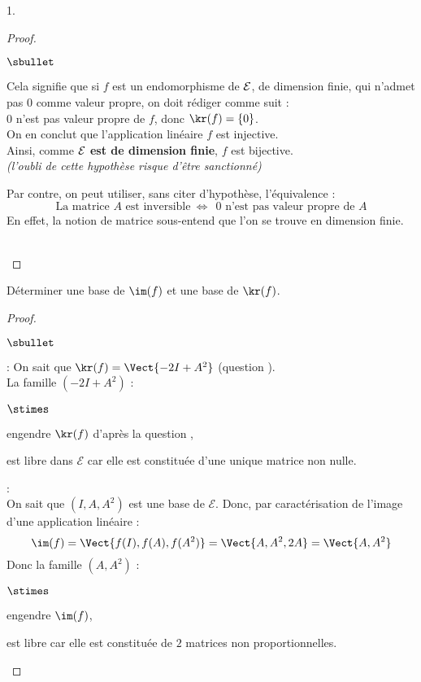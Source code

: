 \begin{noliste}{1.}
\begin{proof}
\begin{remark}
\begin{noliste}{$\sbullet$}
      \item Cela signifie que si $f$ est un endomorphisme de ${\cal
          E}$, de dimension finie, qui n'admet pas $0$ comme valeur
        propre, on doit rédiger comme suit :\\[.2cm]
        $0$ n'est pas valeur propre de $f$, donc $\kr(f) = \{0\}$.\\
        On en conclut que l'application linéaire $f$ est injective.\\
        Ainsi, comme {\bf ${\cal E}$ est de dimension finie}, $f$ est
        bijective.\\
        {\it (l'oubli de cette hypothèse risque d'être sanctionné)}
        
      \item Par contre, on peut utiliser, sans citer d'hypothèse,
      l'équivalence :
        \[
        \text{La matrice $A$ est inversible} \ \Leftrightarrow \ \
        \text{$0$ n'est pas valeur propre de $A$}
        \]
        En effet, la notion de matrice sous-entend que l'on se trouve
        en dimension finie.
      \end{noliste}
    \end{remark}~\\[-1.4cm]
\end{proof}

\item Déterminer une base de $\im(f)$ et une base de 
$\kr(f)$.

\begin{proof}~
  \begin{noliste}{$\sbullet$}
   \item {} :
   On sait que $\kr(f)=\Vect{-2I+A^2}$ (question ).\\[.2cm]
   La famille $(-2I+A^2)$ :
   \begin{noliste}{$\stimes$}
    \item engendre $\kr(f)$ d'après la question ,
    \item est libre dans $\mathcal{E}$ car elle est constituée d'une 
    unique matrice non nulle.
   \end{noliste}
   
   \item {} :\\[.1cm]
   On sait que $(I,A,A^2)$ est une base de $\mathcal{E}$. Donc, par 
   caractérisation de l'image d'une application linéaire :
 \[
  \im(f)=\Vect{f(I),f(A),f(A^2)} = \Vect{A,A^2,2A}=\Vect{A,A^2}
 \]
 Donc la famille $(A,A^2)$ :
 \begin{noliste}{$\stimes$}
  \item engendre $\im(f)$,
  \item est libre car elle est constituée de $2$ matrices non 
  proportionnelles.
 \end{noliste}
  \end{noliste}
  

\end{proof}
\end{noliste}
